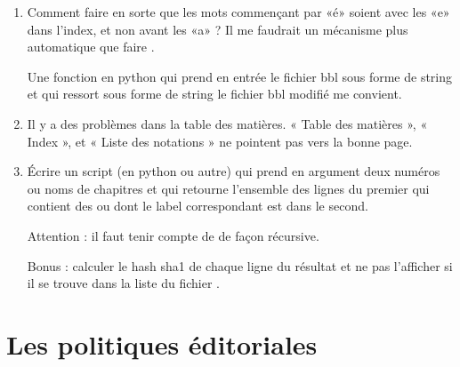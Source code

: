 \begin{enumerate}
	\item
	      Comment faire en sorte que les mots commençant par «é» soient avec les «e» dans l'index, et non avant les «a» ? Il me faudrait un mécanisme plus automatique que faire .

	      Une fonction en python qui prend en entrée le fichier bbl sous forme de string et qui ressort sous forme de string le fichier bbl modifié me convient.
	\item
	      Il y a des problèmes dans la table des matières.  « Table des matières », « Index », et « Liste des notations » ne pointent pas vers la bonne page.


	\item
	      Écrire un script (en python ou autre) qui prend en argument deux numéros ou noms de chapitres et qui retourne l'ensemble des lignes du premier qui contient des  ou  dont le label correspondant est dans le second.

	      Attention : il faut tenir compte de  de façon récursive.

	      Bonus : calculer le hash sha1 de chaque ligne du résultat et ne pas l'afficher si il se trouve dans la liste du fichier .
\end{enumerate}

\section{Les politiques éditoriales}

